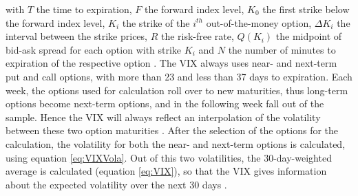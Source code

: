 with $T$ the time to expiration, $F$ the forward index level, $K_{0}$ the first strike below the forward index level, $K_{i}$ the strike of the $i^{th}$ out-of-the-money option, $\Delta K_{i}$ the interval between the strike prices, $R$ the risk-free rate, $Q(K_{i})$ the midpoint of bid-ask spread for each option with strike $K_{i}$ and $N$ the number of minutes to expiration of the respective option \parencite{exchange2009}. The \ac{VIX} always uses near- and next-term put and call options, with more than 23 and less than 37 days to expiration. Each week, the options used for calculation roll over to new maturities, thus long-term options become next-term options, and in the following week fall out of the sample. Hence the \ac{VIX} will always reflect an interpolation of the volatility between these two option maturities \parencite{poon2003}. After the selection of the options for the calculation, the volatility for both the near- and next-term options is calculated, using equation \ref{eq:VIXVola}. Out of this two volatilities, the 30-day-weighted average is calculated (equation \ref{eq:VIX}), so that the \ac{VIX} gives information about the expected volatility over the next 30 days \parencite{exchange2009}. 









